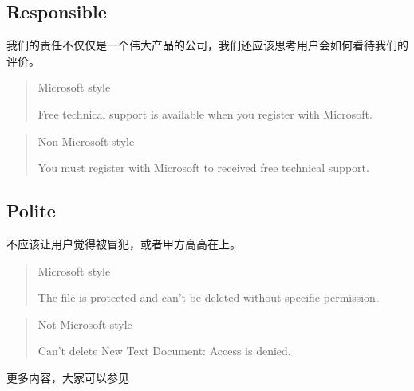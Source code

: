 \documentclass[letterpaper,10pt,english]{sphinxmanual}
\begin{document}
\subsection{Responsible}
\label{\detokenize{doc-quality/style-guide:responsible}}
\sphinxAtStartPar
我们的责任不仅仅是一个伟大产品的公司，我们还应该思考用户会如何看待我们的评价。
\begin{quote}

\sphinxAtStartPar
Microsoft style

\sphinxAtStartPar
Free technical support is available when you register with Microsoft.
\end{quote}
\begin{quote}

\sphinxAtStartPar
Non Microsoft style

\sphinxAtStartPar
You must register with Microsoft to received free technical support.
\end{quote}


\subsection{Polite}
\label{\detokenize{doc-quality/style-guide:polite}}
\sphinxAtStartPar
不应该让用户觉得被冒犯，或者甲方高高在上。
\begin{quote}

\sphinxAtStartPar
Microsoft style

\sphinxAtStartPar
The file is protected and can’t be deleted without specific permission.
\end{quote}
\begin{quote}

\sphinxAtStartPar
Not Microsoft style

\sphinxAtStartPar
Can’t delete New Text Document: Access is denied.
\end{quote}

\sphinxAtStartPar
更多内容，大家可以参见 
\end{document}
